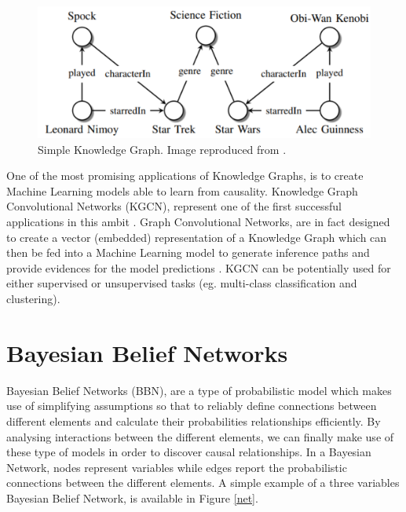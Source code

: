 \begin{figure}[ht!]%
    \centering
    \includegraphics[width=0.67\linewidth]{latex/images/star.pdf}
    \vspace{-0.2cm}
    \caption{Simple Knowledge Graph. Image reproduced from \cite{leonard}.}
    \label{know}
\end{figure}
\vspace{-0.5cm}

One of the most promising applications of Knowledge Graphs, is to create Machine Learning models able to learn from causality. Knowledge Graph Convolutional Networks (KGCN), represent one of the first successful applications in this ambit \cite{gcn}. Graph Convolutional Networks, are in fact designed to create a vector (embedded) representation of a Knowledge Graph which can then be fed into a Machine Learning model to generate inference paths and provide evidences for the model predictions \cite{net2}. KGCN can be potentially used for either supervised or unsupervised tasks (eg. multi-class classification and clustering).

\section{Bayesian Belief Networks}

Bayesian Belief Networks (BBN), are a type of probabilistic model which makes use of simplifying assumptions so that to reliably define connections between different elements and calculate their probabilities relationships efficiently. By analysing interactions between the different elements, we can finally make use of these type of models in order to discover causal relationships. In a Bayesian Network, nodes represent variables while edges report the probabilistic connections between the different elements. A simple example of a three variables Bayesian Belief Network, is available in Figure \ref{net}.

